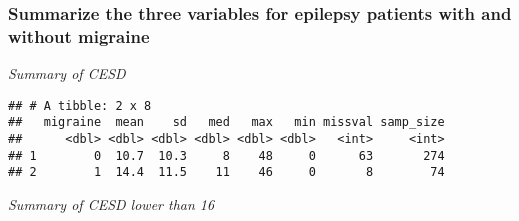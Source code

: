 \documentclass[]{article}
\newenvironment{Shaded}{\begin{snugshade}}{\end{snugshade}}
\newcommand{\KeywordTok}[1]{\textcolor[rgb]{0.13,0.29,0.53}{\textbf{#1}}}
\newcommand{\DataTypeTok}[1]{\textcolor[rgb]{0.13,0.29,0.53}{#1}}
\newcommand{\StringTok}[1]{\textcolor[rgb]{0.31,0.60,0.02}{#1}}
\newcommand{\OtherTok}[1]{\textcolor[rgb]{0.56,0.35,0.01}{#1}}
\newcommand{\OperatorTok}[1]{\textcolor[rgb]{0.81,0.36,0.00}{\textbf{#1}}}
\newcommand{\NormalTok}[1]{#1}
\begin{document}
\subsubsection{Summarize the three variables for epilepsy patients with
and without
migraine}\label{summarize-the-three-variables-for-epilepsy-patients-with-and-without-migraine}

\emph{Summary of CESD}

\begin{Shaded}
\end{Shaded}

\begin{verbatim}
## # A tibble: 2 x 8
##   migraine  mean    sd   med   max   min missval samp_size
##      <dbl> <dbl> <dbl> <dbl> <dbl> <dbl>   <int>     <int>
## 1        0  10.7  10.3     8    48     0      63       274
## 2        1  14.4  11.5    11    46     0       8        74
\end{verbatim}

\emph{Summary of CESD lower than 16}
\end{document}
